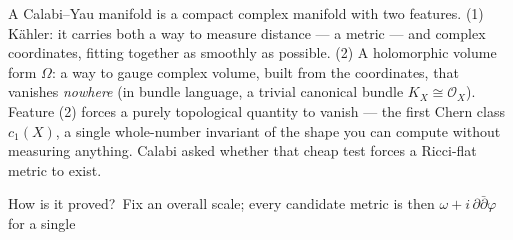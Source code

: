 \documentclass[12pt]{article}
\newcommand{\auterm}[1]{#1}
\newcommand{\CenterBody}{\fontsize{21.6}{30.0}\selectfont}
\begin{document}
\begin{minipage}[t][\BodyH][s]{0.37\textwidth}
\CenterBody

A \auterm{Calabi--Yau manifold} is a compact complex manifold with two
features. \auterm{(1) K\"ahler:} it carries both a way to measure
distance --- a metric --- and complex coordinates, fitting together as
smoothly as possible. \auterm{(2) A holomorphic volume form} $\Omega$:
a way to gauge complex volume, built from the coordinates, that
vanishes {\Serif\itshape nowhere} (in bundle language, a trivial canonical
bundle $K_X \cong \mathcal{O}_X$). Feature (2) forces a purely
\auterm{topological} quantity to vanish --- the \auterm{first Chern
class} $c_1(X)$, a single whole-number invariant of the shape you can
compute without measuring anything. Calabi asked whether that cheap
test forces a Ricci-flat metric to exist.
\par\vspace{0.2em}
{\setlength{\fboxrule}{1.6pt}\setlength{\fboxsep}{0pt}%
}
\vfill
\auterm{How is it proved?}\ Fix an overall scale; every candidate
metric is then $\omega + i\,\partial\bar\partial\varphi$ for a single

\end{minipage}
\end{document}
